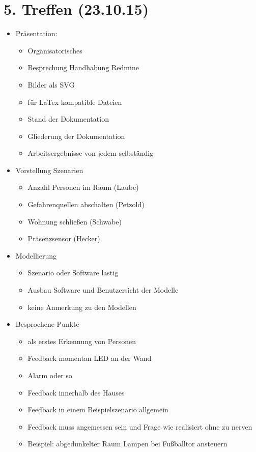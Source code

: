 \section{5. Treffen (23.10.15)}
\begin{itemize}
	\item Präsentation:
	\begin{itemize}
		\item Organisatorisches
		\item Besprechung Handhabung Redmine
		\item Bilder als SVG
		\item für LaTex kompatible Dateien
		\item Stand der Dokumentation
		\item Gliederung der Dokumentation
		\item Arbeitsergebnisse von jedem selbständig
	\end{itemize}
	\item Vorstellung Szenarien
	\begin{itemize}
		\item Anzahl Personen im Raum (Laube)
		\item Gefahrenquellen abschalten (Petzold)
		\item Wohnung schließen (Schwabe)
		\item Präsenzsensor (Hecker)
	\end{itemize}
	\item Modellierung
	\begin{itemize}
		\item Szenario oder Software lastig
		\item Ausbau Software und Benutzersicht der Modelle
		\item keine Anmerkung zu den Modellen
	\end{itemize}
	\item Besprochene Punkte
	\begin{itemize}
		\item als erstes Erkennung von Personen
		\item Feedback momentan LED an der Wand
		\item Alarm oder so
		\item Feedback innerhalb des Hauses
		\item Feedback in einem Beispielszenario allgemein
		\item Feedback muss angemessen sein und Frage wie realisiert ohne zu nerven
		\item Beispiel: abgedunkelter Raum Lampen bei Fußballtor ansteuern

\end{itemize}
\end{itemize}
